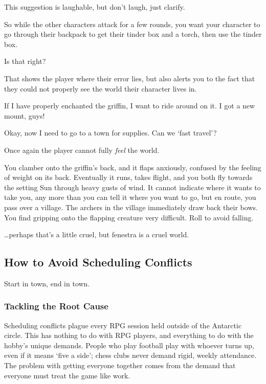 \begin{multicols}{2}
This suggestion is laughable, but don't laugh, just clarify.

\begin{speechtext}
  So while the other characters attack for a few rounds, you want your character to go through their backpack to get their tinder box and a torch, then use the tinder box.

  Is that right?
\end{speechtext}

That shows the player where their error lies, but also alerts you to the fact that they could not properly see the world their character lives in.

\begin{boxtext}
  If I have properly enchanted the griffin, I want to ride around on it.
  I got a new mount, guys!

  Okay, now I need to go to a town for supplies.
  Can we `fast travel'?
\end{boxtext}

Once again the player cannot fully \emph{feel} the world.

\begin{speechtext}
  You clamber onto the griffin's back, and it flaps anxiously, confused by the feeling of weight on its back.
  Eventually it runs, takes flight, and you both fly towards the setting Sun through heavy gusts of wind.
  It cannot indicate where it wants to take you, any more than you can tell it where you want to go, but en route, you pass over a village.
  The archers in the village immediately draw back their bows.
  You find gripping onto the flapping creature very difficult.
  Roll  to avoid falling.
  
\end{speechtext}

\noindent
\ldots perhaps that's a little cruel, but \gls{fenestra} is a cruel world.

\subsection{How to Avoid Scheduling Conflicts}

Start in town, end in town.

\subsubsection{Tackling the Root Cause}

Scheduling conflicts plague every RPG session held outside of the Antarctic circle.
This has nothing to do with RPG players, and everything to do with the hobby's unique demands.
People who play football play with whoever turns up, even if it means `five a side'; chess clubs never demand rigid, weekly attendance.
The problem with getting everyone together comes from the demand that everyone must treat the game like work.


\end{multicols}
